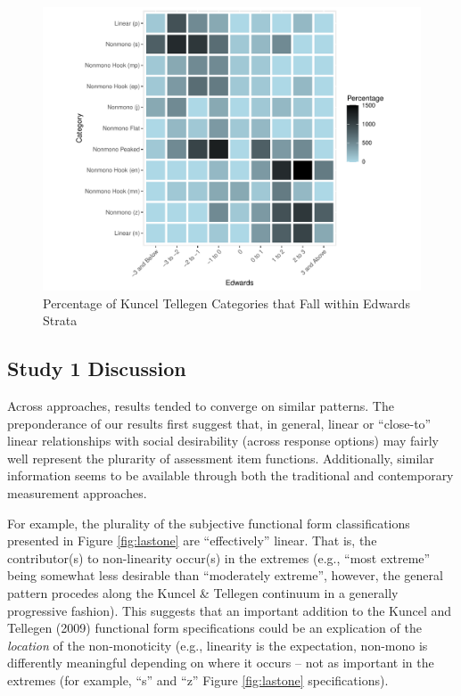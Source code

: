 \documentclass[
  ,jou]{apa6}
\begin{document}
\begin{figure}
\centering
\includegraphics{FullStudy_files/figure-latex/Figure4-1.pdf}
\caption{\label{fig:Figure4}Percentage of Kuncel Tellegen Categories that Fall within Edwards Strata}
\end{figure}

\subsection{Study 1 Discussion}\label{study-1-discussion}

Across approaches, results tended to converge on similar patterns. The preponderance of our results first suggest that, in general, linear or ``close-to'' linear relationships with social desirability (across response options) may fairly well represent the plurarity of assessment item functions. Additionally, similar information seems to be available through both the traditional and contemporary measurement approaches.

For example, the plurality of the subjective functional form classifications presented in Figure \ref{fig:lastone} are ``effectively'' linear. That is, the contributor(s) to non-linearity occur(s) in the extremes (e.g., ``most extreme'' being somewhat less desirable than ``moderately extreme'', however, the general pattern procedes along the Kuncel \& Tellegen continuum in a generally progressive fashion). This suggests that an important addition to the Kuncel and Tellegen (2009) functional form specifications could be an explication of the \emph{location} of the non-monoticity (e.g., linearity is the expectation, non-mono is differently meaningful depending on where it occurs -- not as important in the extremes (for example, ``s'' and ``z'' Figure \ref{fig:lastone} specifications).
\end{document}
